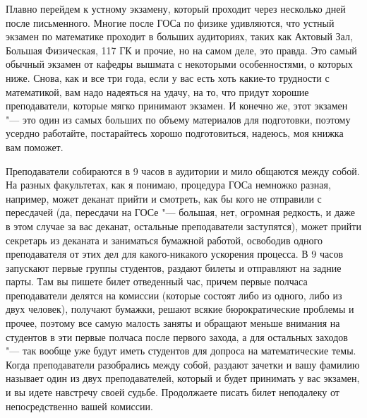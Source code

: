Плавно перейдем к устному экзамену, который проходит через несколько дней после письменного. Многие после ГОСа по физике удивляются, что устный экзамен по математике проходит в больших аудиториях, таких как Актовый Зал, Большая Физическая, 117 ГК и прочие, но на самом деле, это правда. Это самый обычный экзамен от кафедры вышмата с некоторыми особенностями, о которых ниже. Снова, как и все три года, если у вас есть хоть какие-то трудности с математикой, вам надо надеяться на удачу, на то, что придут хорошие преподаватели, которые мягко принимают экзамен. И конечно же, этот экзамен "--- это один из самых больших по объему материалов для подготовки, поэтому усердно работайте, постарайтесь хорошо подготовиться, надеюсь, моя книжка вам поможет.

Преподаватели собираются в 9 часов в аудитории и мило общаются между собой. На разных факультетах, как я понимаю, процедура ГОСа немножко разная, например, может деканат прийти и смотреть, как бы кого не отправили с пересдачей (да, пересдачи на ГОСе "--- большая, нет, огромная редкость, и даже в этом случае за вас деканат, остальные преподаватели заступятся), может прийти секретарь из деканата и заниматься бумажной работой, освободив одного преподавателя от этих дел для какого-никакого ускорения процесса. В 9 часов запускают первые группы студентов, раздают билеты и отправляют на задние парты. Там вы пишете билет отведенный час, причем первые полчаса  преподаватели делятся на комиссии (которые состоят либо из одного, либо из двух человек), получают бумажки, решают всякие бюрократические проблемы и прочее, поэтому все самую малость заняты и обращают меньше внимания на студентов в эти первые полчаса после первого захода, а для остальных заходов "--- так вообще уже будут иметь студентов для допроса на математические темы. Когда преподаватели разобрались между собой, раздают зачетки и вашу фамилию называет один из двух преподавателей, который и будет принимать у вас экзамен, и вы идете навстречу своей судьбе. Продолжаете писать билет неподалеку от  непосредственно вашей комиссии.

